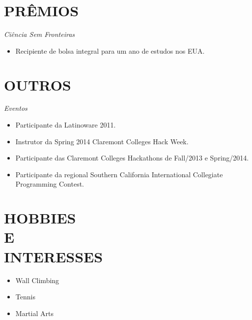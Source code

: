 \documentclass[margin]{res}
\begin{document}
\begin{resume}
		\section{PRÊMIOS}
			{\sl Ciência Sem Fronteiras}
			\begin{itemize}
				\item[] Recipiente de bolsa integral para um ano de estudos nos EUA.
			\end{itemize}

		\section{OUTROS}
			{\sl Eventos}
			\begin{itemize}
				\item[] Participante da Latinoware 2011.
				\item[] Instrutor da Spring 2014 Claremont Colleges Hack Week.
				\item[] Participante das Claremont Colleges Hackathons de Fall/2013 e Spring/2014.
				\item[] Participante da regional Southern California International Collegiate Programming Contest.
			\end{itemize}

		\section{HOBBIES \\ E \\ INTERESSES}
			\begin{itemize}
				\itemsep -2pt
		    	\item Wall Climbing
		    	\item Tennis
	 			\item Martial Arts
			\end{itemize}
	\end{resume}
\end{document}
